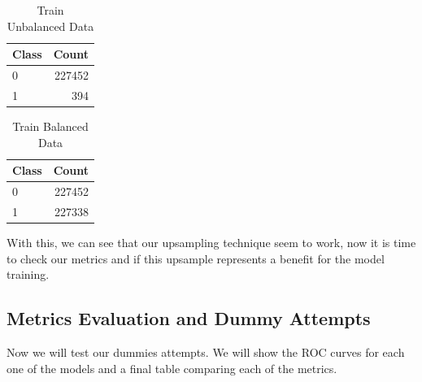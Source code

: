 \documentclass[
]{article}
\begin{document}
\begin{table}[!h]

\caption{\label{tab:data_split}Train Unbalanced Data}
\centering
\fontsize{10}{12}\selectfont
\begin{tabular}[t]{lr}
\toprule
Class & Count\\
\midrule
0 & 227452\\
1 & 394\\
\bottomrule
\end{tabular}
\end{table}

\begin{table}[!h]

\caption{\label{tab:data_split}Train Balanced Data}
\centering
\fontsize{10}{12}\selectfont
\begin{tabular}[t]{lr}
\toprule
Class & Count\\
\midrule
0 & 227452\\
1 & 227338\\
\bottomrule
\end{tabular}
\end{table}

With this, we can see that our upsampling technique seem to work, now it
is time to check our metrics and if this upsample represents a benefit
for the model training.

\hypertarget{metrics-evaluation-and-dummy-attempts}{%
\subsection{Metrics Evaluation and Dummy
Attempts}\label{metrics-evaluation-and-dummy-attempts}}

Now we will test our dummies attempts. We will show the ROC curves for
each one of the models and a final table comparing each of the metrics.
\end{document}
